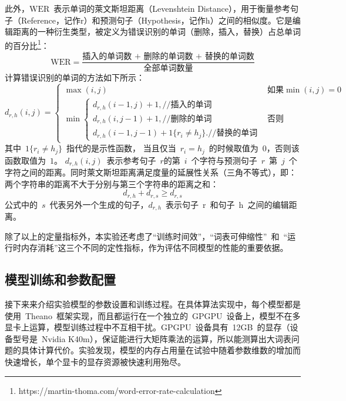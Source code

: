 此外，$\mathrm{WER}$~表示单词的萊文斯坦距离（Levenshtein Distance），用于衡量参考句子（Reference，记作r）和预测句子（Hypothesis，记作h）之间的相似度。它是编辑距离的一种衍生类型，被定义为错误识别的单词（删除，插入，替换）占总单词的百分比\footnote{https://martin-thoma.com/word-error-rate-calculation}：
\begin{equation}\label{equ:wer}
  \mathrm{WER} = \frac{\text{插入的单词数 + 删除的单词数 + 替换的单词数}}{\text{全部单词数量}}
\end{equation}
计算错误识别的单词的方法如下所示：
\begin{equation}\label{equ:distance}
d_{r,h}(i,j)=\begin{cases}
\max (i,j)& \text{如果}\min(i,j)=0\\
\min  \begin{cases}
d_{r,h}(i-1,j)+1,\text{//插入的单词}\\
d_{r,h}(i,j-1)+1,\text{//删除的单词}\\
d_{r,h}(i-1,j-1)+1\{r_i\neq h_j\}.\text{//替换的单词}
\end{cases} &\text{否则}
\end{cases}
\end{equation}
其中~$1\{r_i\neq h_j\}$~指代的是示性函数， 当且仅当~$r_i= h_j$~的时候取值为~$0$，否则该函数取值为~$1$。 $d_{r,h}(i,j)$~表示参考句子~$r$的第~$i$~个字符与预测句子~$r$~第~$j$~个字符之间的距离。同时萊文斯坦距离满足度量的延展性关系（三角不等式），即： 两个字符串的距离不大于分别与第三个字符串的距离之和：
\begin{equation}
d_{r,h}+d_{r,s}\ge d_{r,s}
\end{equation}
公式中的~$s$~代表另外一个生成的句子，$d_{r,h}$~表示句子~r~和句子~h~之间的编辑距离。

除了以上的定量指标外，本实验还考虑了``训练时间效''，``词表可伸缩性''~和~``运行时内存消耗''这三个不同的定性指标，作为评估不同模型的性能的重要依据。

\subsection{模型训练和参数配置}
接下来来介绍实验模型的参数设置和训练过程。在具体算法实现中，每个模型都是使用~Theano~框架实现，而且都运行在一个独立的~GPGPU~设备上，模型不在多显卡上运算，模型训练过程中不互相干扰。GPGPU~设备具有~12GB~的显存（设备型号是~Nvidia K40m），保证能进行大矩阵乘法的运算，所以能测算出大词表问题的具体计算代价。实验发现，模型的内存占用量在试验中随着参数维数的增加而快速增长，单个显卡的显存资源被快速利用殆尽。

